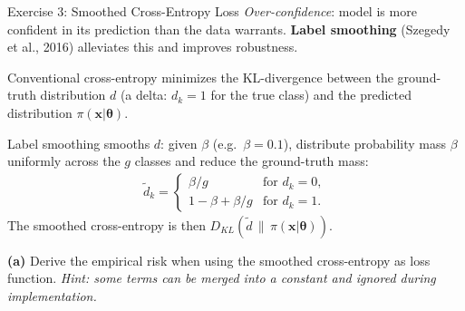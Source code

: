 \documentclass[aspectratio=169]{beamer}
\begin{document}
\begin{frame}{Exercise 3: Smoothed Cross-Entropy Loss}
	\textit{Over-confidence}: model is more confident in its prediction than the data warrants. \textbf{Label smoothing} (Szegedy et al., 2016) alleviates this and improves robustness.

	Conventional cross-entropy minimizes the KL-divergence between the ground-truth distribution $d$ (a delta: $d_k = 1$ for the true class) and the predicted distribution $\pi(\mathbf{x} | \bm{\theta})$.

	Label smoothing smooths $d$: given $\beta$ (e.g.\ $\beta = 0.1$), distribute probability mass $\beta$ uniformly across the $g$ classes and reduce the ground-truth mass:
	\begin{align*}
		\tilde{d}_k = \begin{cases}
			\beta / g & \text{for } d_k = 0, \\
			1 - \beta + \beta / g & \text{for } d_k = 1.
		\end{cases}
	\end{align*}
	The smoothed cross-entropy is then $D_{KL}(\tilde{d} \, \| \, \pi(\mathbf{x}|\bm{\theta}))$.

	\vspace{4pt}
	\textbf{(a)} Derive the empirical risk when using the smoothed cross-entropy as loss function. \textit{Hint: some terms can be merged into a constant and ignored during implementation.}
\end{frame}
\end{document}
